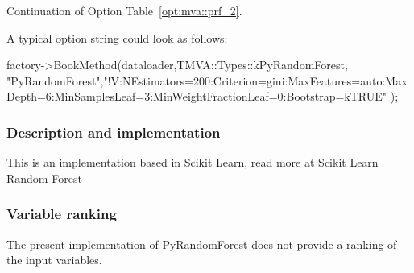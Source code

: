 \begin{option}[p]

\caption[.]{\optionCaptionSize 
     Continuation of Option Table~\ref{opt:mva::prf_2}.     
}
\label{opt:mva::prf_3}
\end{option}



A typical option string could look as follows:
\begin{codeexample}
\begin{tmvacode}
factory->BookMethod(dataloader,TMVA::Types::kPyRandomForest, "PyRandomForest",\newline "!V:NEstimators=200:Criterion=gini:MaxFeatures=auto:MaxDepth=6:MinSamplesLeaf=3:MinWeightFractionLeaf=0:Bootstrap=kTRUE" );
\end{tmvacode}
\label{ce:PyRandomForestexample}
\end{codeexample}

\subsubsection{Description and implementation}
This is an implementation based in Scikit Learn,
read more at \href{http://scikit-learn.org/stable/modules/ensemble.html#forests-of-randomized-trees}{Scikit Learn Random Forest}

\subsubsection{Variable ranking}

The present implementation of PyRandomForest does not provide a ranking 
of the input variables.

% 

